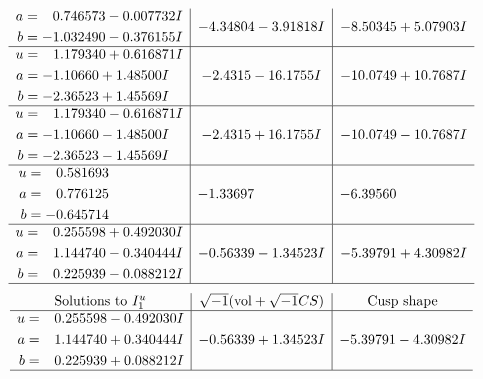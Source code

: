 \documentclass[1p]{elsarticle_modified}
\theoremstyle{definition}
\newcommand{\I}{\sqrt{-1}}
\begin{document}
$$\begin{array}{c|c|c}
\begin{aligned}
a &= \phantom{-}0.746573 - 0.007732 I \\
b &= -1.032490 - 0.376155 I\end{aligned}
 & -4.34804 - 3.91818 I & -8.50345 + 5.07903 I \\ \hline\begin{aligned}
u &= \phantom{-}1.179340 + 0.616871 I \\
a &= -1.10660 + 1.48500 I \\
b &= -2.36523 + 1.45569 I\end{aligned}
 & -2.4315 - 16.1755 I & -10.0749 + 10.7687 I \\ \hline\begin{aligned}
u &= \phantom{-}1.179340 - 0.616871 I \\
a &= -1.10660 - 1.48500 I \\
b &= -2.36523 - 1.45569 I\end{aligned}
 & -2.4315 + 16.1755 I & -10.0749 - 10.7687 I \\ \hline\begin{aligned}
u &= \phantom{-}0.581693\phantom{ +0.000000I} \\
a &= \phantom{-}0.776125\phantom{ +0.000000I} \\
b &= -0.645714\phantom{ +0.000000I}\end{aligned}
 & -1.33697\phantom{ +0.000000I} & -6.39560\phantom{ +0.000000I} \\ \hline\begin{aligned}
u &= \phantom{-}0.255598 + 0.492030 I \\
a &= \phantom{-}1.144740 - 0.340444 I \\
b &= \phantom{-}0.225939 - 0.088212 I\end{aligned}
 & -0.56339 - 1.34523 I & -5.39791 + 4.30982 I\\
 \hline 
 \end{array}$$\newpage$$\begin{array}{c|c|c}  
\text{Solutions to }I^u_{1}& \I (\text{vol} + \sqrt{-1}CS) & \text{Cusp shape}\\
 \hline 
\begin{aligned}
u &= \phantom{-}0.255598 - 0.492030 I \\
a &= \phantom{-}1.144740 + 0.340444 I \\
b &= \phantom{-}0.225939 + 0.088212 I\end{aligned}
 & -0.56339 + 1.34523 I & -5.39791 - 4.30982 I\\
 \hline 
 \end{array}$$\newpage\newpage\renewcommand{\arraystretch}{1}
\end{document}
